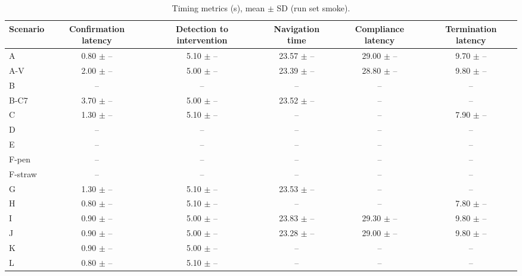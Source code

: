 \begin{table}[t]\centering\small
\caption{Timing metrics (s), mean $\pm$ SD (run set smoke).}
\begin{tabular}{lccccc}
\toprule
Scenario & Confirmation latency & Detection to intervention & Navigation time & Compliance latency & Termination latency \\
\midrule
A & 0.80 $\pm$ – & 5.10 $\pm$ – & 23.57 $\pm$ – & 29.00 $\pm$ – & 9.70 $\pm$ – \\
A-V & 2.00 $\pm$ – & 5.00 $\pm$ – & 23.39 $\pm$ – & 28.80 $\pm$ – & 9.80 $\pm$ – \\
B & -- & -- & -- & -- & -- \\
B-C7 & 3.70 $\pm$ – & 5.00 $\pm$ – & 23.52 $\pm$ – & -- & -- \\
C & 1.30 $\pm$ – & 5.10 $\pm$ – & -- & -- & 7.90 $\pm$ – \\
D & -- & -- & -- & -- & -- \\
E & -- & -- & -- & -- & -- \\
F-pen & -- & -- & -- & -- & -- \\
F-straw & -- & -- & -- & -- & -- \\
G & 1.30 $\pm$ – & 5.10 $\pm$ – & 23.53 $\pm$ – & -- & -- \\
H & 0.80 $\pm$ – & 5.10 $\pm$ – & -- & -- & 7.80 $\pm$ – \\
I & 0.90 $\pm$ – & 5.00 $\pm$ – & 23.83 $\pm$ – & 29.30 $\pm$ – & 9.80 $\pm$ – \\
J & 0.90 $\pm$ – & 5.00 $\pm$ – & 23.28 $\pm$ – & 29.00 $\pm$ – & 9.80 $\pm$ – \\
K & 0.90 $\pm$ – & 5.00 $\pm$ – & -- & -- & -- \\
L & 0.80 $\pm$ – & 5.10 $\pm$ – & -- & -- & -- \\
\bottomrule
\end{tabular}
\end{table}
